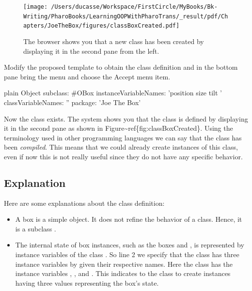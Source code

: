 \documentclass[10pt,twoside,english]{_support/latex/sbabook/sbabook}
\begin{document}
\begin{figure}

\begin{center}
\texttt{[image: /Users/ducasse/Workspace/FirstCircle/MyBooks/Bk-Writing/PharoBooks/LearningOOPWithPharoTrans/\_result/pdf/Chapters/JoeTheBox/figures/classBoxCreated.pdf]}\caption{The browser shows you that a new class has been created by displaying it in the second pane from the left.\label{classBoxCreated}}\end{center}
\end{figure}
 

Modify the proposed template to obtain the class definition and in the bottom pane bring the menu and choose the Accept menu item. 

\begin{displaycode}{plain}
Object subclass: #OBox
   instanceVariableNames: 'position size tilt '
   classVariableNames: ''
   package: 'Joe The Box'
\end{displaycode}

Now the class exists. The system shows you that the class is defined by displaying it in the second pane as shown in Figure\textasciitilde{}ref\{fig:classBoxCreated\}.  Using the terminology used in other programming languages we can say that the
class has been \textit{compiled}.  This means that we could already
create instances of this class, even if now this is not really useful
since they do not have any specific behavior.
	
\subsection{Explanation }
Here are some explanations about the class definition: 

\begin{itemize}
\item A box is a simple object. It does not refine the behavior of a class. Hence, it is a subclass .
\end{itemize}

\begin{itemize}
\item The internal state of box instances, such as the boxes  and , is represented by instance variables of the class .  So line 2 we specify that the class  has three instance variables by given their respective names.  Here the class  has the instance variables , , and .  This indicates to the class  to create instances having three values representing the box's state. 
\end{itemize}
\end{document}

